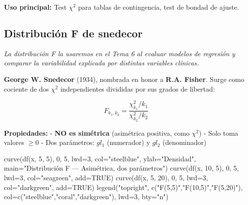 \documentclass[
  letterpaper,
  DIV=11,
  numbers=noendperiod]{scrartcl}
\newenvironment{Shaded}{\begin{snugshade}}{\end{snugshade}}
\newcommand{\AttributeTok}[1]{\textcolor[rgb]{0.40,0.45,0.13}{#1}}
\newcommand{\ConstantTok}[1]{\textcolor[rgb]{0.56,0.35,0.01}{#1}}
\newcommand{\DecValTok}[1]{\textcolor[rgb]{0.68,0.00,0.00}{#1}}
\newcommand{\FunctionTok}[1]{\textcolor[rgb]{0.28,0.35,0.67}{#1}}
\newcommand{\NormalTok}[1]{\textcolor[rgb]{0.00,0.23,0.31}{#1}}
\newcommand{\StringTok}[1]{\textcolor[rgb]{0.13,0.47,0.30}{#1}}
\begin{document}
\textbf{Uso principal:} Test \(\chi^2\) para tablas de contingencia,
test de bondad de ajuste.

\subsection{Distribución F de
snedecor}\label{distribucion-f-de-snedecor}

\emph{La distribución F la usaremos en el Tema 6 al evaluar modelos de
regresión y comparar la variabilidad explicada por distintas variables
clínicas.}

\textbf{George W. Snedecor} (1934), nombrada en honor a \textbf{R.A.
Fisher}. Surge como cociente de dos \(\chi^2\) independientes divididas
por sus grados de libertad:

\[F_{k_1, k_2} = \frac{\chi^2_{k_1} / k_1}{\chi^2_{k_2} / k_2}\]

\textbf{Propiedades:} - \textbf{NO es simétrica} (asimétrica positiva,
como \(\chi^2\)) - Solo toma valores \(\geq 0\) - Dos parámetros:
\(gl_1\) (numerador) y \(gl_2\) (denominador)

\begin{Shaded}
\begin{Highlighting}[]
\FunctionTok{curve}\NormalTok{(}\FunctionTok{df}\NormalTok{(x, }\DecValTok{5}\NormalTok{, }\DecValTok{5}\NormalTok{), }\DecValTok{0}\NormalTok{, }\DecValTok{5}\NormalTok{, }\AttributeTok{lwd=}\DecValTok{3}\NormalTok{, }\AttributeTok{col=}\StringTok{"steelblue"}\NormalTok{, }\AttributeTok{ylab=}\StringTok{"Densidad"}\NormalTok{,}
      \AttributeTok{main=}\StringTok{"Distribución F — Asimétrica, dos parámetros"}\NormalTok{)}
\FunctionTok{curve}\NormalTok{(}\FunctionTok{df}\NormalTok{(x, }\DecValTok{10}\NormalTok{, }\DecValTok{5}\NormalTok{), }\DecValTok{0}\NormalTok{, }\DecValTok{5}\NormalTok{, }\AttributeTok{lwd=}\DecValTok{3}\NormalTok{, }\AttributeTok{col=}\StringTok{"seagreen"}\NormalTok{, }\AttributeTok{add=}\ConstantTok{TRUE}\NormalTok{)}
\FunctionTok{curve}\NormalTok{(}\FunctionTok{df}\NormalTok{(x, }\DecValTok{5}\NormalTok{, }\DecValTok{20}\NormalTok{), }\DecValTok{0}\NormalTok{, }\DecValTok{5}\NormalTok{, }\AttributeTok{lwd=}\DecValTok{3}\NormalTok{, }\AttributeTok{col=}\StringTok{"darkgreen"}\NormalTok{, }\AttributeTok{add=}\ConstantTok{TRUE}\NormalTok{)}
\FunctionTok{legend}\NormalTok{(}\StringTok{"topright"}\NormalTok{, }\FunctionTok{c}\NormalTok{(}\StringTok{"F(5,5)"}\NormalTok{,}\StringTok{"F(10,5)"}\NormalTok{,}\StringTok{"F(5,20)"}\NormalTok{), }\AttributeTok{col=}\FunctionTok{c}\NormalTok{(}\StringTok{"steelblue"}\NormalTok{,}\StringTok{"coral"}\NormalTok{,}\StringTok{"darkgreen"}\NormalTok{), }\AttributeTok{lwd=}\DecValTok{3}\NormalTok{, }\AttributeTok{bty=}\StringTok{"n"}\NormalTok{)}
\end{Highlighting}
\end{Shaded}
\end{document}
